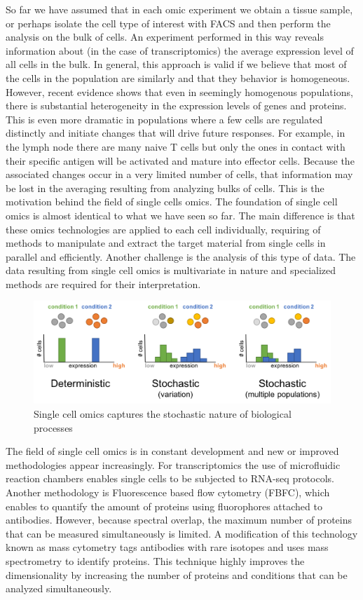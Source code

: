 \documentclass[]{book}
\theoremstyle{definition}
\theoremstyle{definition}
\theoremstyle{definition}
\theoremstyle{remark}
\begin{document}
So far we have assumed that in each omic experiment we obtain a tissue
sample, or perhaps isolate the cell type of interest with FACS and then
perform the analysis on the bulk of cells. An experiment performed in
this way reveals information about (in the case of transcriptomics) the
average expression level of all cells in the bulk. In general, this
approach is valid if we believe that most of the cells in the population
are similarly and that they behavior is homogeneous. However, recent
evidence shows that even in seemingly homogenous populations, there is
substantial heterogeneity in the expression levels of genes and
proteins. This is even more dramatic in populations where a few cells
are regulated distinctly and initiate changes that will drive future
responses. For example, in the lymph node there are many naive T cells
but only the ones in contact with their specific antigen will be
activated and mature into effector cells. Because the associated changes
occur in a very limited number of cells, that information may be lost in
the averaging resulting from analyzing bulks of cells. This is the
motivation behind the field of single cells omics. The foundation of
single cell omics is almost identical to what we have seen so far. The
main difference is that these omics technologies are applied to each
cell individually, requiring of methods to manipulate and extract the
target material from single cells in parallel and efficiently. Another
challenge is the analysis of this type of data. The data resulting from
single cell omics is multivariate in nature and specialized methods are
required for their interpretation.

\begin{figure}
\includegraphics[width=15.22in]{pic/ngs_sc} \caption{Single cell omics captures the stochastic nature of biological processes}\label{fig:sc}
\end{figure}

The field of single cell omics is in constant development and new or
improved methodologies appear increasingly. For transcriptomics the use
of microfluidic reaction chambers enables single cells to be subjected
to RNA-seq protocols. Another methodology is Fluorescence based flow
cytometry (FBFC), which enables to quantify the amount of proteins using
fluorophores attached to antibodies. However, because spectral overlap,
the maximum number of proteins that can be measured simultaneously is
limited. A modification of this technology known as mass cytometry tags
antibodies with rare isotopes and uses mass spectrometry to identify
proteins. This technique highly improves the dimensionality by
increasing the number of proteins and conditions that can be analyzed
simultaneously.
\end{document}
